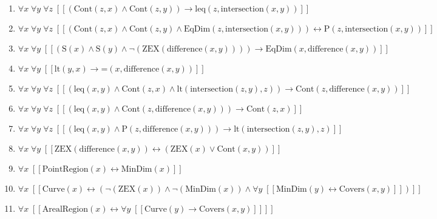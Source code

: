 \documentclass{article}
\begin{document}
\begin{enumerate}
\item $\forall x\; \forall y\; \forall z\;  \left[ \left[ \left(\textrm{Cont}(z,x) \land \textrm{Cont}(z,y)\right) \rightarrow \textrm{leq}(z,\textrm{intersection}(x,y)) \right] \right]$
\item $\forall x\; \forall y\; \forall z\;  \left[ \left[ \left(\textrm{Cont}(z,x) \land \textrm{Cont}(z,y) \land \textrm{EqDim}(z,\textrm{intersection}(x,y))\right) \leftrightarrow \textrm{P}(z,\textrm{intersection}(x,y)) \right] \right]$
\item $\forall x\; \forall y\;  \left[ \left[ \left(\textrm{S}(x) \land \textrm{S}(y) \land \neg \left(\textrm{ZEX}(\textrm{difference}(x,y))\right)\right) \rightarrow \textrm{EqDim}(x,\textrm{difference}(x,y)) \right] \right]$
\item $\forall x\; \forall y\;  \left[ \left[ \textrm{lt}(y,x) \rightarrow \textrm{=}(x,\textrm{difference}(x,y)) \right] \right]$
\item $\forall x\; \forall y\; \forall z\;  \left[ \left[ \left(\textrm{leq}(x,y) \land \textrm{Cont}(z,x) \land \textrm{lt}(\textrm{intersection}(z,y),z)\right) \rightarrow \textrm{Cont}(z,\textrm{difference}(x,y)) \right] \right]$
\item $\forall x\; \forall y\; \forall z\;  \left[ \left[ \left(\textrm{leq}(x,y) \land \textrm{Cont}(z,\textrm{difference}(x,y))\right) \rightarrow \textrm{Cont}(z,x) \right] \right]$
\item $\forall x\; \forall y\; \forall z\;  \left[ \left[ \left(\textrm{leq}(x,y) \land \textrm{P}(z,\textrm{difference}(x,y))\right) \rightarrow \textrm{lt}(\textrm{intersection}(z,y),z) \right] \right]$
\item $\forall x\; \forall y\;  \left[ \left[ \textrm{ZEX}(\textrm{difference}(x,y)) \leftrightarrow \left(\textrm{ZEX}(x) \lor \textrm{Cont}(x,y)\right) \right] \right]$
\item $\forall x\;  \left[ \left[ \textrm{PointRegion}(x) \leftrightarrow \textrm{MinDim}(x) \right] \right]$
\item $\forall x\;  \left[ \left[ \textrm{Curve}(x) \leftrightarrow \left(\neg \left(\textrm{ZEX}(x)\right) \land \neg \left(\textrm{MinDim}(x)\right) \land \forall y\;  \left[ \left[ \textrm{MinDim}(y) \leftrightarrow \textrm{Covers}(x,y) \right] \right]\right) \right] \right]$
\item $\forall x\;  \left[ \left[ \textrm{ArealRegion}(x) \leftrightarrow \forall y\;  \left[ \left[ \textrm{Curve}(y) \rightarrow \textrm{Covers}(x,y) \right] \right] \right] \right]$
\end{enumerate}
\end{document}
